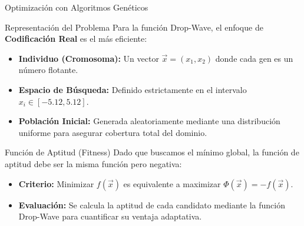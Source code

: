 \documentclass[aspectratio=169,xcolor=dvipsnames]{beamer}
\theoremstyle{definition}
\theoremstyle{remark}
\begin{document}
    \begin{frame}{Optimización con Algoritmos Genéticos}
        \begin{block}{Representación del Problema}
            Para la función Drop-Wave, el enfoque de \textbf{Codificación Real} es el más eficiente:
            \begin{itemize}
                \item \textbf{Individuo (Cromosoma):} Un vector $\vec{x} = (x_1, x_2)$ donde cada gen es un número flotante.
                \item \textbf{Espacio de Búsqueda:} Definido estrictamente en el intervalo $x_i \in [-5.12, 5.12]$.
                \item \textbf{Población Inicial:} Generada aleatoriamente mediante una distribución uniforme para asegurar cobertura total del dominio.
            \end{itemize}
        \end{block}

        \begin{block}{Función de Aptitud (Fitness)}
            Dado que buscamos el mínimo global, la función de aptitud debe ser la misma función pero negativa: 
            \begin{itemize}
                \item \textbf{Criterio:} Minimizar $f(\vec{x})$ es equivalente a maximizar $\Phi(\vec{x}) = -f(\vec{x})$.
                \item \textbf{Evaluación:} Se calcula la aptitud de cada candidato mediante la función Drop-Wave para cuantificar su ventaja adaptativa.
            \end{itemize}
        \end{block}
    \end{frame}
\end{document}
